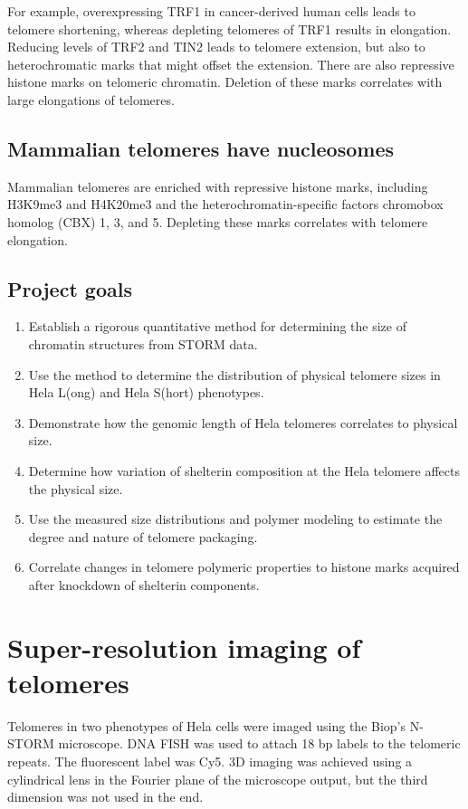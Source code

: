 \documentclass[11pt]{article}
\begin{document}
For example, overexpressing TRF1 in cancer-derived human cells leads
to telomere shortening, whereas depleting telomeres of TRF1 results in
elongation. Reducing levels of TRF2 and TIN2 leads to telomere
extension, but also to heterochromatic marks that might offset the
extension. There are also repressive histone marks on telomeric
chromatin. Deletion of these marks correlates with large elongations
of telomeres.

\subsection{Mammalian telomeres have nucleosomes}
\label{sec-1-3}
Mammalian telomeres are enriched with repressive histone marks,
including H3K9me3 and H4K20me3 and the heterochromatin-specific
factors chromobox homolog (CBX) 1, 3, and 5. Depleting these marks
correlates with telomere elongation.

\subsection{Project goals}
\label{sec-1-4}

\begin{enumerate}
\item Establish a rigorous quantitative method for determining the size
of chromatin structures from STORM data.
\item Use the method to determine the distribution of physical telomere
sizes in Hela L(ong) and Hela S(hort) phenotypes.
\item Demonstrate how the genomic length of Hela telomeres correlates to
physical size.
\item Determine how variation of shelterin composition at the Hela
telomere affects the physical size.
\item Use the measured size distributions and polymer modeling to
estimate the degree and nature of telomere packaging.
\item Correlate changes in telomere polymeric properties to histone marks
acquired after knockdown of shelterin components.
\end{enumerate}

\section{Super-resolution imaging of telomeres}
\label{sec-2}
Telomeres in two phenotypes of Hela cells were imaged using the Biop's
N-STORM microscope. DNA FISH was used to attach 18 bp labels to the
telomeric repeats. The fluorescent label was Cy5. 3D imaging was
achieved using a cylindrical lens in the Fourier plane of the
microscope output, but the third dimension was not used in the end.
\end{document}
